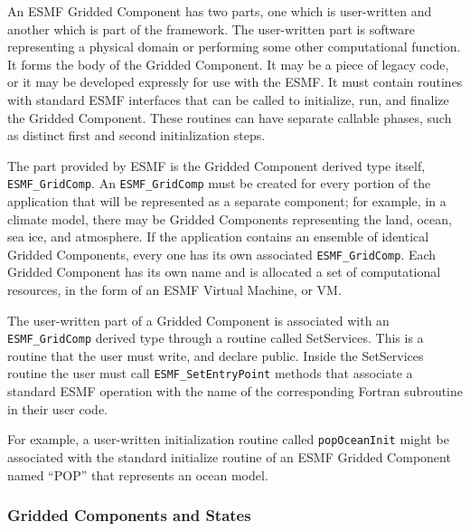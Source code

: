 An ESMF Gridded Component has two parts, one which is user-written
and another which is part of the framework.  The user-written
part is software representing a physical domain or performing some
other computational function.  It forms the body of the Gridded 
Component.  It may be a piece of legacy code, or it may be developed 
expressly for use with the ESMF.  It must contain routines with
standard ESMF interfaces that can be called to initialize, run, and
finalize the Gridded Component.  These routines can have separate 
callable phases, such as distinct first and second initialization steps.

The part provided by ESMF is the Gridded Component derived type 
itself, {\tt ESMF\_GridComp}.  An {\tt ESMF\_GridComp} must be created 
for every portion of the application that will be represented 
as a separate component; for example, in a climate model, there may 
be Gridded Components representing the land, ocean, sea ice, and 
atmosphere.  If the application contains an ensemble of identical 
Gridded Components, every one has its own associated {\tt ESMF\_GridComp}.
Each Gridded Component has its own name and is allocated
a set of computational resources, in the form of an ESMF Virtual
Machine, or VM.

The user-written part of a Gridded Component is associated with an
{\tt ESMF\_GridComp} derived type through a routine called SetServices.
This is a routine that the user must write, and declare public.
Inside the SetServices routine the user must call  
{\tt ESMF\_SetEntryPoint} methods that associate a standard ESMF 
operation with the name of the corresponding Fortran subroutine in their user code.  

For example, a user-written initialization routine called {\tt popOceanInit} 
might be associated with the standard initialize routine of an ESMF 
Gridded Component named ``POP'' that represents an ocean model.

\subsubsection{Gridded Components and States}







